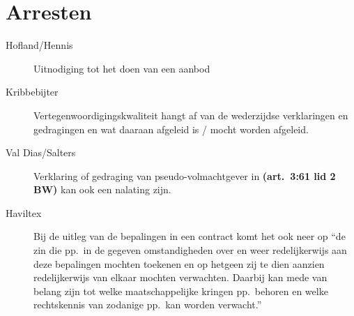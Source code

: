 \documentclass[a4paper]{article}
\newcommand{\art}[1]{\textbf{(art.~#1 BW)}\xspace}
\begin{document}
\section{Arresten}

\begin{description}

  \item[Hofland/Hennis] Uitnodiging tot het doen van een aanbod

  \item[Kribbebijter] Vertegenwoordigingskwaliteit hangt af van de wederzijdse
    verklaringen en gedragingen en wat daaraan afgeleid is / mocht worden
    afgeleid.

  \item[Val Dias/Salters] Verklaring of gedraging van pseudo-volmachtgever in
    \art{3:61 lid 2} kan ook een nalating zijn.

  \item[Haviltex] Bij de uitleg van de bepalingen in een contract komt het ook
    neer op ``de zin die pp.~in de gegeven omstandigheden over en weer
    redelijkerwijs aan deze bepalingen mochten toekenen en op hetgeen zij te
    dien aanzien redelijkerwijs van elkaar mochten verwachten. Daarbij kan
    mede van belang zijn tot welke maatschappelijke kringen pp.~behoren en
    welke rechtskennis van zodanige pp.~kan worden verwacht.''

\end{description}
\end{document}
